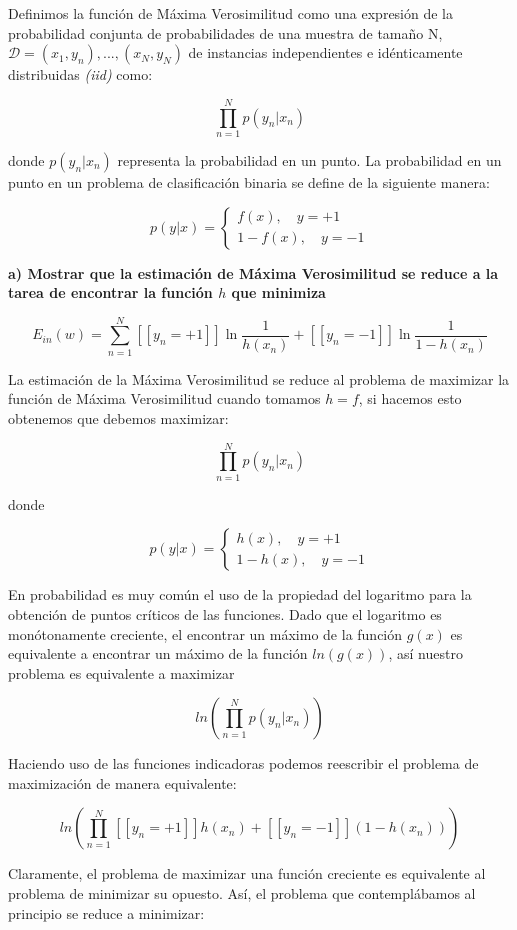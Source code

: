\documentclass{article}
\begin{document}
	Definimos la función de Máxima Verosimilitud como una expresión de la probabilidad conjunta de probabilidades de una muestra de tamaño N, $\mathcal{D} = (x_1, y_n),..., (x_N, y_N)$ de instancias independientes e idénticamente distribuidas\textit{ (iid) } como:
	
	\[
		\prod_{n=1}^{N} p(y_n| x_n)
	\] 
	
	donde $p(y_n| x_n)$  representa la probabilidad en un punto. La probabilidad en un punto en un problema de clasificación binaria se define de la siguiente manera:
	
	\[
		p(y|x) = \begin{cases}
			f(x), \quad y = +1
			\\1-f(x), \quad y = -1
		\end{cases}
	\]

\textbf{a) Mostrar que la estimación de Máxima Verosimilitud se reduce a la tarea de encontrar la función $h$ que minimiza}

\[
	E_{in}(w) = \sum_{n=1}^N[[y_n = +1]] \ln \frac{1}{h(x_n)} + [[y_n = -1]] \ln \frac{1}{1-h(x_n)}
\]

La estimación de la Máxima Verosimilitud se reduce al problema de maximizar la función de Máxima Verosimilitud cuando tomamos $h=f$, si hacemos esto obtenemos que debemos maximizar:

\[
\prod_{n=1}^{N} p(y_n| x_n)
\] 

donde 

\[
p(y|x) = \begin{cases}
h(x), \quad y = +1
\\1-h(x), \quad y = -1
\end{cases}
\]

En probabilidad es muy común el uso de la propiedad del logaritmo para la obtención de puntos críticos de las funciones. Dado que el logaritmo es monótonamente creciente, el encontrar un máximo de la función $g(x)$ es equivalente a encontrar un máximo de la función $ln(g(x))$, así nuestro problema es equivalente a maximizar

\[
ln\left(\prod_{n=1}^{N} p(y_n| x_n)\right)
\] 

 
 Haciendo uso de las funciones indicadoras podemos reescribir el problema de maximización de manera equivalente:
 
 \[
 ln\left(\prod_{n=1}^{N} [[y_n = +1]]h(x_n) + [[y_n = -1]](1-h(x_n))\right)
 \] 
 
Claramente, el problema de maximizar una función creciente es equivalente al problema de minimizar su opuesto. Así, el problema que contemplábamos al principio se reduce a minimizar: 
\end{document}

